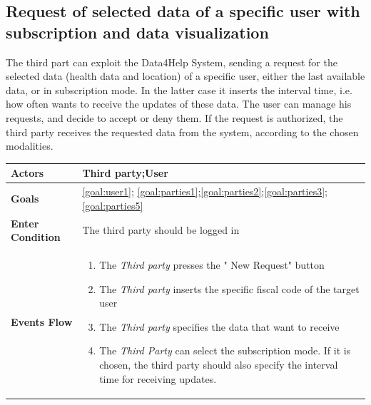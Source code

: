  \subsection{Request of selected data of a specific user with subscription and data visualization}
 
The third part can exploit the Data4Help System, sending a request for the selected data (health data and location) of a specific user, either the last available data, or in subscription mode.  
 In the latter case  it inserts the interval time, i.e. how often wants to receive the updates of these data.
The user can manage his requests, and decide to accept or deny them. If the request is authorized, the third party receives the requested data from the system, according to the chosen modalities.

\begin{table}[H]
	\centering
    
    \begin{tabular}{|p{3.5cm}|p{10.3cm}|}
    
    \hline
    \textbf{\large{Actors}}  			& \tabitem Third party;\tabitem  User  									\\
    				 			
    \hline
    \textbf{\large{Goals}} 				&\ref{goal:user1}; \ref{goal:parties1};\ref{goal:parties2};\ref{goal:parties3};\ref{goal:parties5}\\
    
    \hline
    \textbf{\large{Enter Condition}} & The third party should be logged in	\\
    
    \hline
    \textbf{\large{Events Flow}}		& \begin{enumerate}[leftmargin=0.5cm]
                                          	\item The \emph{Third party}  presses the " New Request" button
                                            \item The \emph{Third party} inserts the specific fiscal code of the target user
                                            \item The \emph{Third party} specifies the data that want to receive
                                            
                                            \item The \emph{Third Party} can select the subscription mode. If 
                            it is chosen, the third party should also specify the interval time for receiving updates. 
                            

\end{enumerate}
\end{tabular}
\end{table}
